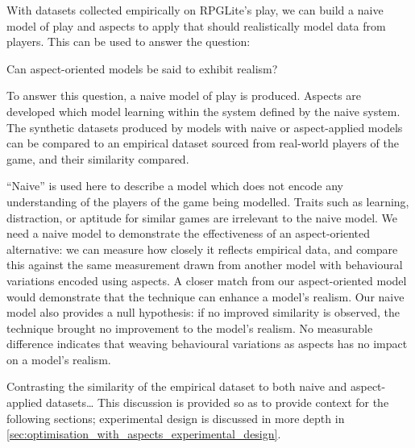 With datasets collected empirically on RPGLite's play, we can build a naive
model of play and aspects to apply that should realistically model data from
players. This can be used to answer the question:

\begin{researchquestion}
    Can aspect-oriented models be said to exhibit realism?
\end{researchquestion}


To answer this question, a naive model of play is produced. Aspects are
developed which model learning within the system defined by the naive system.
The synthetic datasets produced by models with naive or aspect-applied models
can be compared to an empirical dataset sourced from real-world players of the
game, and their similarity compared. 

``Naive'' is used here to describe a model which does not encode any
understanding of the players of the game being modelled. Traits such as
learning, distraction, or aptitude for similar games are irrelevant to the naive
model. We need a naive model to demonstrate the effectiveness of an
aspect-oriented alternative: we can measure how closely it reflects empirical
data, and compare this against the same measurement drawn from another model
with behavioural variations encoded using aspects. A closer match from our
aspect-oriented model would demonstrate that the technique can enhance a model's
realism. Our naive model also provides a null hypothesis: if no improved
similarity is observed, the technique brought no improvement to the model's
realism. No measurable difference indicates that weaving behavioural variations
as aspects has no impact on a model's realism.


 Contrasting the similarity of the empirical dataset to both
naive and aspect-applied datasets\ldots{} This discussion is provided so as to
provide context for the following sections; experimental design is discussed in
more depth in \cref{sec:optimisation_with_aspects_experimental_design}. 



